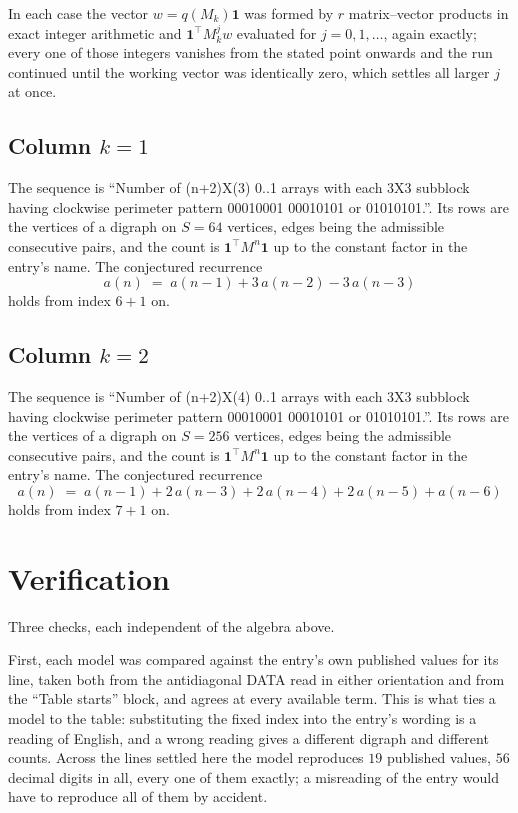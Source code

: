 \documentclass[11pt,a4paper]{article}
\theoremstyle{plain}
\theoremstyle{definition}
\begin{document}
In each case the vector $w=q(M_k)\mathbf{1}$ was formed by $r$ matrix--vector products in
exact integer arithmetic and $\mathbf{1}^{\!\top}M_k^{j}w$ evaluated for $j=0,1,\dots$,
again exactly; every one of those integers vanishes from the stated point onwards and the run
continued until the working vector was identically zero, which settles all larger $j$ at once.

\subsection*{Column $k$$=1$}
The sequence is ``Number of (n+2)X(3) 0..1 arrays with each 3X3 subblock having clockwise perimeter pattern 00010001 00010101 or 01010101.''. Its rows are the vertices of a digraph on
$S=64$ vertices, edges being the admissible consecutive pairs, and the count is
$\mathbf{1}^{\!\top}M^{n}\mathbf{1}$ up to the constant factor in the entry's name.
The conjectured recurrence
\[
a(n)\;=\;a(n-1) + 3\,a(n-2) - 3\,a(n-3)
\]
holds from index $6+1$ on.

\subsection*{Column $k$$=2$}
The sequence is ``Number of (n+2)X(4) 0..1 arrays with each 3X3 subblock having clockwise perimeter pattern 00010001 00010101 or 01010101.''. Its rows are the vertices of a digraph on
$S=256$ vertices, edges being the admissible consecutive pairs, and the count is
$\mathbf{1}^{\!\top}M^{n}\mathbf{1}$ up to the constant factor in the entry's name.
The conjectured recurrence
\[
a(n)\;=\;a(n-1) + 2\,a(n-3) + 2\,a(n-4) + 2\,a(n-5) + a(n-6)
\]
holds from index $7+1$ on.

\section{Verification}

Three checks, each independent of the algebra above.

First, each model was compared against the entry's own published values for its line, taken
both from the antidiagonal DATA read in either orientation and from the ``Table starts''
block, and agrees at every available term. This is what ties a model to the table:
substituting the fixed index into the entry's wording is a reading of English, and a wrong
reading gives a different digraph and different counts. Across the lines settled here the
model reproduces $19$ published values, $56$ decimal digits in all, every one of
them exactly; a misreading of the entry would have to reproduce all of them by accident.
\end{document}

